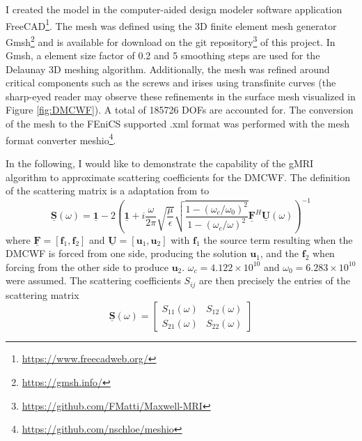 \documentclass[11pt, a4paper]{article}
\begin{document}
I created the model in the computer-aided design modeler software application
FreeCAD\footnote{\url{https://www.freecadweb.org/}}. The mesh was defined using 
the 3D finite element mesh generator Gmsh\footnote{\url{https://gmsh.info/}} and 
is available for download on the git repository\footnote{\url{https://github.com/FMatti/Maxwell-MRI}}
of this project. In Gmsh, a element size factor of 0.2 and 5 smoothing steps
are used for the Delaunay 3D meshing algorithm. Additionally, 
the mesh was refined around critical components such as the screws and irises
using transfinite curves (the sharp-eyed reader may observe these refinements
in the surface mesh visualized in Figure \ref{fig:DMCWF}). A total of
185726 \acrshort{DOF}s are accounted for. The conversion of the
mesh to the FEniCS supported .xml format was performed with the mesh format converter
meshio\footnote{\url{https://github.com/nschloe/meshio}}. 

In the following, I would like to demonstrate the capability of the 
\acrshort{gMRI} algorithm to approximate scattering coefficients for the \acrshort{DMCWF}.
The definition of the scattering matrix is a adaptation from \cite{shortMRI} to
\begin{equation}
    \mathbf{\underline{S}}(\omega) = \mathbf{\underline{1}}
    - 2\left( \mathbf{\underline{1}} + i \frac{\omega}{2\pi} \sqrt{\frac{\mu}{\epsilon}}
    \sqrt{\frac{1 - (\omega_c / \omega_0)^2}{1 - (\omega_c / \omega)^2}} 
    \mathbf{\underline{F}}^H \mathbf{\underline{U}}(\omega) \right)^{-1}
\end{equation}
where $\mathbf{\underline{F}} = [\mathbf{f}_1, \mathbf{f}_2]$ and
$\mathbf{\underline{U}} = [\mathbf{u}_1, \mathbf{u}_2]$ with $\mathbf{f}_1$ the source term
resulting when the \acrshort{DMCWF} is forced from one side, producing the
solution $\mathbf{u}_1$, and the $\mathbf{f}_2$ when forcing from the other side to
produce $\mathbf{u}_2$. $\omega_c = 4.122 \times 10^{10}$ and $\omega_0 = 6.283 \times 10^{10}$
were assumed. The scattering coefficients $S_{ij}$ are then precisely the
entries of the scattering matrix
\begin{equation}
    \mathbf{\underline{S}}(\omega) =
    \begin{bmatrix}
            S_{11}(\omega) & S_{12}(\omega) \\
            S_{21}(\omega) & S_{22}(\omega)
    \end{bmatrix}\label{equ:scattering-coefficients}
\end{equation}
\end{document}

